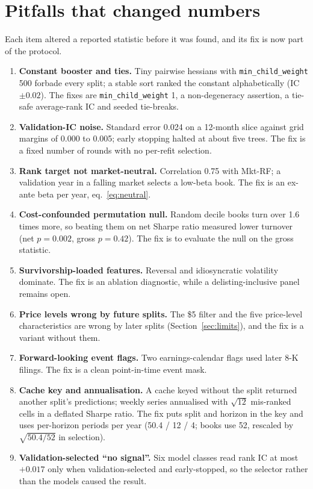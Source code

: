 \section{Pitfalls that changed numbers}\label{app:pitfalls}

Each item altered a reported statistic before it was found, and its fix is now part of the protocol.
\begin{enumerate}
\item \textbf{Constant booster and ties.} Tiny pairwise hessians with \texttt{min\_child\_weight} 500 forbade every split; a stable sort ranked the constant alphabetically (IC $\pm0.02$). The fixes are \texttt{min\_child\_weight} 1, a non-degeneracy assertion, a tie-safe average-rank IC and seeded tie-breaks.
\item \textbf{Validation-IC noise.} Standard error 0.024 on a 12-month slice against grid margins of 0.000 to 0.005; early stopping halted at about five trees. The fix is a fixed number of rounds with no per-refit selection.
\item \textbf{Rank target not market-neutral.} Correlation 0.75 with Mkt-RF; a validation year in a falling market selects a low-beta book. The fix is an ex-ante beta per year, eq.~\eqref{eq:neutral}.
\item \textbf{Cost-confounded permutation null.} Random decile books turn over 1.6 times more, so beating them on net Sharpe ratio measured lower turnover (net $p=0.002$, gross $p=0.42$). The fix is to evaluate the null on the gross statistic.
\item \textbf{Survivorship-loaded features.} Reversal and idiosyncratic volatility dominate. The fix is an ablation diagnostic, while a delisting-inclusive panel remains open.
\item \textbf{Price levels wrong by future splits.} The \$5 filter and the five price-level characteristics are wrong by later splits (Section~\ref{sec:limits}), and the fix is a variant without them.
\item \textbf{Forward-looking event flags.} Two earnings-calendar flags used later 8-K filings. The fix is a clean point-in-time event mask.
\item \textbf{Cache key and annualisation.} A cache keyed without the split returned another split's predictions; weekly series annualised with $\sqrt{12}$ mis-ranked cells in a deflated Sharpe ratio. The fix puts split and horizon in the key and uses per-horizon periods per year (50.4 / 12 / 4; books use 52, rescaled by $\sqrt{50.4/52}$ in selection).
\item \textbf{Validation-selected ``no signal''.} Six model classes read rank IC at most $+0.017$ only when validation-selected and early-stopped, so the selector rather than the models caused the result.
\end{enumerate}
